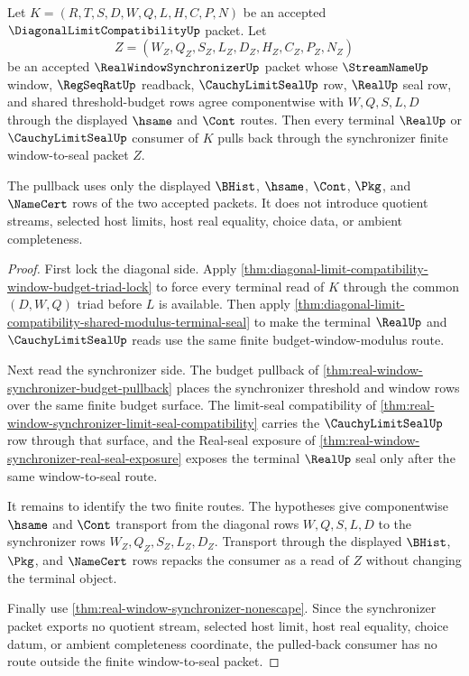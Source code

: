 \begin{theorem}
\label{thm:diagonal-limit-window-synchronizer-pullback}
Let $K=(R,T,S,D,W,Q,L,H,C,P,N)$ be an accepted $\DiagonalLimitCompatibilityUp$ packet. Let
$$
Z=(W_Z,Q_Z,S_Z,L_Z,D_Z,H_Z,C_Z,P_Z,N_Z)
$$
be an accepted $\RealWindowSynchronizerUp$ packet whose $\StreamNameUp$ window, $\RegSeqRatUp$ readback, $\CauchyLimitSealUp$ row, $\RealUp$ seal row, and shared threshold-budget rows agree componentwise with $W,Q,S,L,D$ through the displayed $\hsame$ and $\Cont$ routes. Then every terminal $\RealUp$ or $\CauchyLimitSealUp$ consumer of $K$ pulls back through the synchronizer finite window-to-seal packet $Z$.

The pullback uses only the displayed $\BHist$, $\hsame$, $\Cont$, $\Pkg$, and $\NameCert$ rows of the two accepted packets. It does not introduce quotient streams, selected host limits, host real equality, choice data, or ambient completeness.
\end{theorem}
\begin{proof}
First lock the diagonal side. Apply \autoref{thm:diagonal-limit-compatibility-window-budget-triad-lock} to force every terminal read of $K$ through the common $(D,W,Q)$ triad before $L$ is available. Then apply \autoref{thm:diagonal-limit-compatibility-shared-modulus-terminal-seal} to make the terminal $\RealUp$ and $\CauchyLimitSealUp$ reads use the same finite budget-window-modulus route.

Next read the synchronizer side. The budget pullback of \autoref{thm:real-window-synchronizer-budget-pullback} places the synchronizer threshold and window rows over the same finite budget surface. The limit-seal compatibility of \autoref{thm:real-window-synchronizer-limit-seal-compatibility} carries the $\CauchyLimitSealUp$ row through that surface, and the Real-seal exposure of \autoref{thm:real-window-synchronizer-real-seal-exposure} exposes the terminal $\RealUp$ seal only after the same window-to-seal route.

It remains to identify the two finite routes. The hypotheses give componentwise $\hsame$ and $\Cont$ transport from the diagonal rows $W,Q,S,L,D$ to the synchronizer rows $W_Z,Q_Z,S_Z,L_Z,D_Z$. Transport through the displayed $\BHist$, $\Pkg$, and $\NameCert$ rows repacks the consumer as a read of $Z$ without changing the terminal object.

Finally use \autoref{thm:real-window-synchronizer-nonescape}. Since the synchronizer packet exports no quotient stream, selected host limit, host real equality, choice datum, or ambient completeness coordinate, the pulled-back consumer has no route outside the finite window-to-seal packet.
\end{proof}


